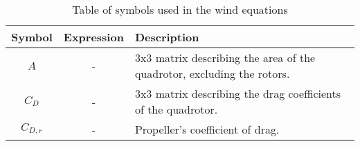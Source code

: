     \begin{table}
        \begin{tabularx}{\tablewidth}{|c|c|X|}\hline
            \textbf{Symbol} & \textbf{Expression} & \textbf{Description} \\\hline
            $A$ & - & 3x3 matrix describing the area of the quadrotor, excluding the rotors. \\\hline
            $C_{D}$ & - & 3x3 matrix describing the drag coefficients of the quadrotor. \\\hline
            $C_{D,r}$ & - & Propeller's coefficient of drag. \\\hline
        \end{tabularx}
        \label{tbl:observer:wind:symbols}
        \caption{Table of symbols used in the wind equations}
    \end{table}
